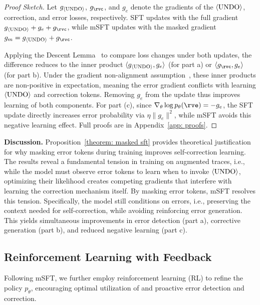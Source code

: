 \begin{proof}[Proof Sketch]
Let $g_{\langle\textnormal{UNDO}\rangle}$, $g_\rvc$, and $g_e$ denote the gradients of the $\langle\textnormal{UNDO}\rangle$, correction, and error losses, respectively. 
SFT updates with the full gradient $g_{\bk} + g_e + g_\rvc$, while mSFT updates with the masked gradient $g_m = g_{\bk} + g_\rvc$. 

Applying the Descent Lemma~\citep{nesterov2013introductory} to compare loss changes under both updates, the difference reduces to the inner product $\langle g_{\langle\textnormal{UNDO}\rangle}, g_e \rangle$ (for part a) or $\langle g_\rvc, g_e \rangle$ (for part b). Under the gradient non-alignment assumption~\citep{yu2020gradient}, these inner products are non-positive in expectation, meaning the error gradient conflicts with learning $\langle\textnormal{UNDO}\rangle$ and correction tokens. Removing $g_e$ from the update thus improves learning of both components. For part (c), since $\nabla_\theta \log p_\theta(\rve) = -g_e$, the SFT update directly increases error probability via $\eta\|g_e\|^2$, while mSFT avoids this negative learning effect. Full proofs are in Appendix~\ref{app: proofs}.
\end{proof}

\textbf{Discussion.}
Proposition~\ref{theorem: masked sft} provides theoretical justification for why masking error tokens during training improves self-correction learning. 
The results reveal a fundamental tension in training on augmented traces, i.e., while the model must {observe} error tokens to learn when to invoke $\langle\textnormal{UNDO}\rangle$, {optimizing} their likelihood creates competing gradients that interfere with learning the correction mechanism itself.
By masking error tokens, mSFT resolves this tension.
Specifically, the model still conditions on errors, i.e., preserving the context needed for self-correction, while avoiding reinforcing error generation.
This yields simultaneous improvements in error detection (part a), corrective generation (part b), and reduced negative learning (part c).


\subsection{Reinforcement Learning with Feedback}
Following mSFT, we further employ reinforcement learning (RL) to refine the policy $p_\theta$, encouraging optimal utilization of \bk and proactive error detection and correction.

